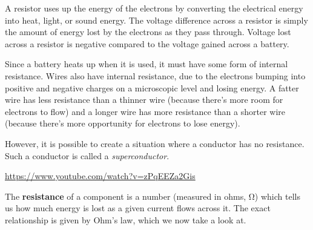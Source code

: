 \documentclass[a4paper]{amsbook}
\begin{document}
A resistor uses up the energy of the electrons by converting the electrical energy into heat, light, or sound energy. The voltage difference across
a resistor is simply the amount of energy lost by the electrons as they pass through. Voltage lost across a resistor is negative compared to the
voltage gained across a battery.

Since a battery heats up when it is used, it must have some form of internal resistance. Wires also have internal resistance, due to the electrons
bumping into positive and negative charges on a microscopic level and losing energy. A fatter wire has less resistance than a thinner wire (because
there's more room for electrons to flow) and a longer wire has more resistance than a shorter wire (because there's more opportunity for electrons
to lose energy).

However, it is possible to create a situation where a conductor has no resistance. Such a conductor is called a \textit{superconductor}.

\begin{center}
\begin{tcolorbox}[width=0.8\textwidth,colback={red},title={\textbf{Go and watch...}},colbacktitle=yellow,coltitle=blue]
  \textcolor{white}{\url{https://www.youtube.com/watch?v=zPqEEZa2Gis}}
\end{tcolorbox}
\end{center}

The \textbf{resistance} of a component is a number (measured in ohms, \si{\ohm}) which tells us how much energy is lost as a given current flows
across it. The exact relationship is given by Ohm's law, which we now take a look at.
\end{document}
